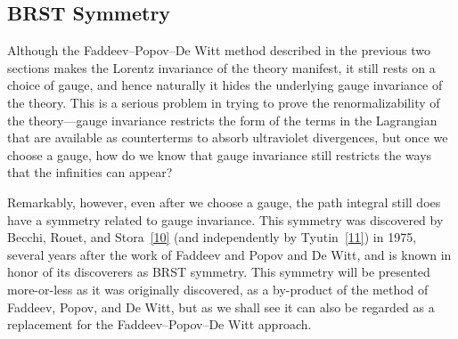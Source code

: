 \subsection{BRST Symmetry}
\label{sec:15.7}

Although the Faddeev--Popov--De Witt method described in the previous two sections makes the Lorentz invariance of the theory manifest, it still rests on a choice of gauge, and hence naturally it hides the underlying gauge invariance of the theory. This is a serious problem in trying to prove the renormalizability of the theory---gauge invariance restricts the form of the terms in the Lagrangian that are available as counterterms to absorb ultraviolet divergences, but once we choose a gauge, how do we know that gauge invariance still restricts the ways that the infinities can appear?

Remarkably, however, even after we choose a gauge, the path integral still does have a symmetry related to gauge invariance. This symmetry was discovered by Becchi, Rouet, and Stora~\hyperref[ch15-ref-10]{[10]} (and independently by Tyutin~\hyperref[ch15-ref-11]{[11]}) in 1975, several years after the work of Faddeev and Popov and De Witt, and is known in honor of its discoverers as BRST symmetry. This symmetry will be presented more-or-less as it was originally discovered, as a by-product of the method of Faddeev, Popov, and De Witt, but as we shall see it can also be regarded as a replacement for the Faddeev--Popov--De Witt approach.

